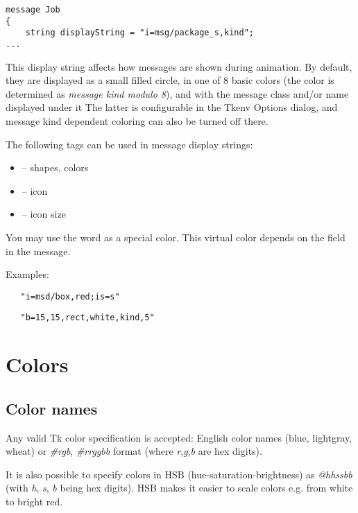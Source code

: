 \begin{verbatim}
message Job
{
    string displayString = "i=msg/package_s,kind";
...
\end{verbatim}

This display string affects how messages are shown during animation.
By default, they are displayed as a small filled circle, in one of
8 basic colors (the color is determined as \textit{message kind modulo 8}),
and with the message class and/or name displayed under it
The latter is configurable in the Tkenv Options dialog, and message kind
dependent coloring can also be turned off there.

The following tags can be used in message display strings:
\begin{itemize}
  \item{ -- shapes, colors}
  \item{ -- icon}
  \item{ -- icon size}
\end{itemize}

\begin{note}
   You may use the word  as a special color. This virtual color depends on 
   the  field in the message.
\end{note}

Examples:
\begin{verbatim}
   "i=msd/box,red;is=s"
\end{verbatim}

\begin{verbatim}
   "b=15,15,rect,white,kind,5"
\end{verbatim}



\section{Colors}
\label{sec:ch-graphics:colors}

\subsection{Color names}

Any valid Tk color specification is accepted: English color names
(blue, lightgray, wheat) or \textit{\#rgb}, \textit{\#rrggbb} format
(where \textit{r},\textit{g},\textit{b} are hex digits).

It is also possible to specify colors in HSB (hue-saturation-brightness) as
\textit{@hhssbb} (with \textit{h}, \textit{s}, \textit{b} being hex digits).
HSB makes it easier to scale colors e.g. from white to bright red.

